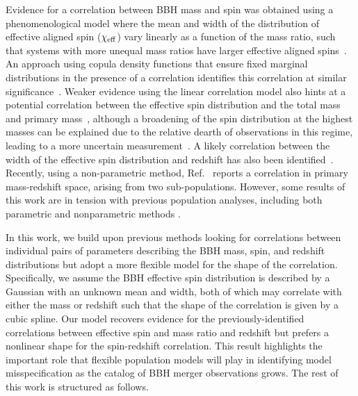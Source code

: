 \documentclass[%
 reprint,
 amsmath,amssymb,
 aps,
 prd,
]{revtex4-2}
\newcommand{\chieff}{\chi_{\rm eff}}
\begin{document}
Evidence for a correlation between \ac{BBH} mass and spin was obtained using a phenomenological model where the mean and width of the distribution of effective aligned spin ($\chieff$) vary linearly as a function of the mass ratio, such that systems with more unequal mass ratios have larger effective aligned spins~\citep{Callister:2021fpo, KAGRA:2021duu}. An approach using copula density functions that ensure fixed marginal distributions in the presence of a correlation identifies this correlation at similar significance~\cite{Adamcewicz:2022hce, Adamcewicz:2023mov}. Weaker evidence using the linear correlation model also hints at a potential correlation between the effective spin distribution and the total mass and primary mass~\cite{Safarzadeh:2020mlb, Franciolini:2022iaa, Biscoveanu:2022qac}, although a broadening of the spin distribution at the highest masses can be explained due to the relative dearth of observations in this regime, leading to a more uncertain measurement~\cite{Tiwari:2021yvr}. A likely correlation between the width of the effective spin distribution and redshift has also been identified~\cite{Biscoveanu:2022qac}. Recently, using a non-parametric method, Ref.~\cite{Rinaldi:2023bbd} reports a correlation in primary mass-redshift space, arising from two sub-populations. However, some results of this work are in tension with previous population analyses, including both parametric and nonparametric methods \cite[e.g.][]{vanSon:2021zpk, Tiwari:2021yvr, Edelman:2022ydv, Callister:2023tgi}. %

In this work, we build upon previous methods looking for correlations between individual pairs of parameters describing the \ac{BBH} mass, spin, and redshift distributions but adopt a more flexible model for the shape of the correlation. Specifically, we assume the \ac{BBH} effective spin distribution is described by a Gaussian with an unknown mean and width, both of which may correlate with either the mass or redshift such that the shape of the correlation is given by a cubic spline. Our model recovers evidence for the previously-identified correlations between effective spin and mass ratio and redshift but prefers a nonlinear shape for the spin-redshift correlation. This result highlights the important role that flexible population models will play in identifying model misspecification as the catalog of \ac{BBH} merger observations grows. The rest of this work is structured as follows. 
\end{document}
